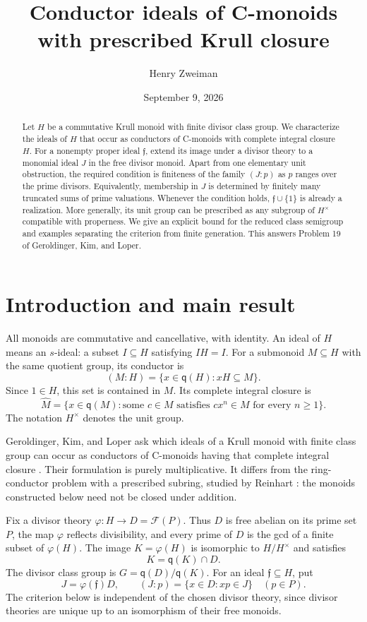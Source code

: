 \documentclass[11pt]{article}
\title{Conductor ideals of C-monoids with prescribed Krull closure}
\author{Henry Zweiman}
\date{September 9, 2026}
\theoremstyle{definition}
\newcommand{\q}{\mathsf q}
\newcommand{\F}{\mathcal F}
\newcommand{\ff}{\mathfrak f}
\begin{document}
\maketitle
\begin{abstract}
Let $H$ be a commutative Krull monoid with finite divisor class group. We characterize the ideals of $H$ that occur as conductors of C-monoids with complete integral closure $H$. For a nonempty proper ideal $\ff$, extend its image under a divisor theory to a monomial ideal $J$ in the free divisor monoid. Apart from one elementary unit obstruction, the required condition is finiteness of the family $(J:p)$ as $p$ ranges over the prime divisors. Equivalently, membership in $J$ is determined by finitely many truncated sums of prime valuations. Whenever the condition holds, $\ff\cup\{1\}$ is already a realization. More generally, its unit group can be prescribed as any subgroup of $H^\times$ compatible with properness. We give an explicit bound for the reduced class semigroup and examples separating the criterion from finite generation. This answers Problem 19 of Geroldinger, Kim, and Loper.
\end{abstract}

\section{Introduction and main result}

All monoids are commutative and cancellative, with identity. An ideal of $H$ means an $s$-ideal: a subset $I\subseteq H$ satisfying $IH=I$. For a submonoid $M\subseteq H$ with the same quotient group, its conductor is
\[
 (M:H)=\{x\in\q(H):xH\subseteq M\}.
\]
Since $1\in H$, this set is contained in $M$. Its complete integral closure is
\[
 \widehat M=\{x\in\q(M):\text{some }c\in M\text{ satisfies }cx^n\in M
                         \text{ for every }n\ge1\}.
\]
The notation $H^\times$ denotes the unit group.

Geroldinger, Kim, and Loper ask which ideals of a Krull monoid with finite class group can occur as conductors of C-monoids having that complete integral closure \cite[Problem 19]{GKL}. Their formulation is purely multiplicative. It differs from the ring-conductor problem with a prescribed subring, studied by Reinhart \cite{Reinhart}: the monoids constructed below need not be closed under addition.

Fix a divisor theory $\varphi:H\to D=\F(P)$. Thus $D$ is free abelian on its prime set $P$, the map $\varphi$ reflects divisibility, and every prime of $D$ is the gcd of a finite subset of $\varphi(H)$. The image $K=\varphi(H)$ is isomorphic to $H/H^\times$ and satisfies
\begin{equation}\label{eq:saturated}
 K=\q(K)\cap D.
\end{equation}
The divisor class group is $G=\q(D)/\q(K)$. For an ideal $\ff\subseteq H$, put
\[
 J=\varphi(\ff)D,\qquad (J:p)=\{x\in D:xp\in J\}\quad(p\in P).
\]
The criterion below is independent of the chosen divisor theory, since divisor theories are unique up to an isomorphism of their free monoids.
\end{document}
